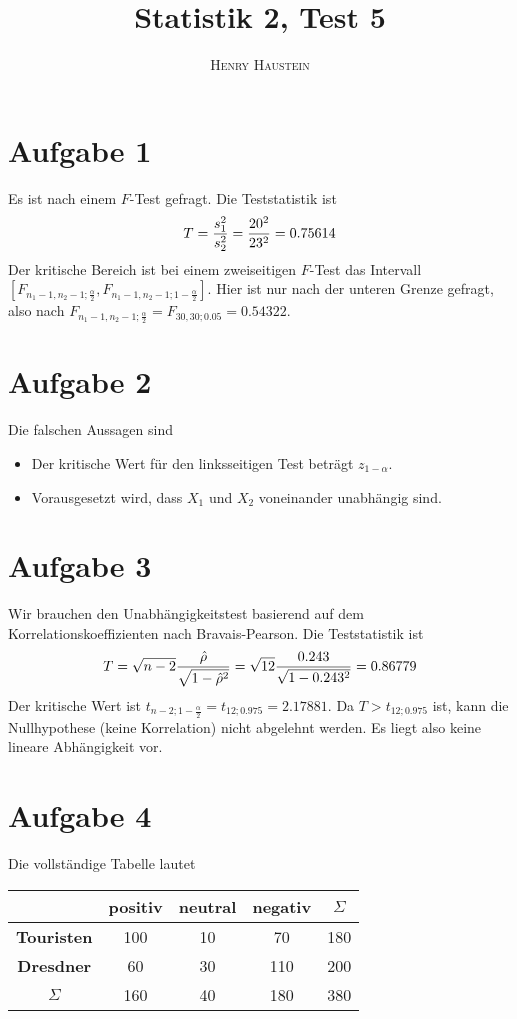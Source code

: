 \documentclass{article}
\title{\textbf{Statistik 2, Test 5}}
\author{\textsc{Henry Haustein}}
\date{}
\begin{document}
	\maketitle
	
	\section*{Aufgabe 1}
	Es ist nach einem $F$-Test gefragt. Die Teststatistik ist
	\begin{align}
		T = \frac{s_1^2}{s_2^2} = \frac{20^2}{23^2} = 0.75614 \notag
	\end{align}
	Der kritische Bereich ist bei einem zweiseitigen $F$-Test das Intervall $[F_{n_1-1,n_2-1;\frac{\alpha}{2}},F_{n_1-1,n_2-1;1-\frac{\alpha}{2}}]$. Hier ist nur nach der unteren Grenze gefragt, also nach $F_{n_1-1,n_2-1;\frac{\alpha}{2}}=F_{30,30;0.05}= 0.54322$.

	\section*{Aufgabe 2}
	Die falschen Aussagen sind
	\begin{itemize}
		\item Der kritische Wert für den linksseitigen Test beträgt $z_{1-\alpha}$.
		\item Vorausgesetzt wird, dass $X_1$ und $X_2$ voneinander unabhängig sind.
	\end{itemize}

	\section*{Aufgabe 3}
	Wir brauchen den Unabhängigkeitstest basierend auf dem Korrelationskoeffizienten nach Bravais-Pearson. Die Teststatistik ist
	\begin{align}
		T = \sqrt{n-2}\frac{\hat{\rho}}{\sqrt{1-\hat{\rho}^2}} = \sqrt{12}\frac{0.243}{\sqrt{1-0.243^2}} = 0.86779 \notag
	\end{align}
	Der kritische Wert ist $t_{n-2;1-\frac{\alpha}{2}} = t_{12;0.975} = 2.17881$. Da $T > t_{12;0.975}$ ist, kann die Nullhypothese (keine Korrelation) nicht abgelehnt werden. Es liegt also keine lineare Abhängigkeit vor.

	\section*{Aufgabe 4}
	Die vollständige Tabelle lautet
	\begin{center}
		\begin{tabular}{c|ccc|c}
			& \textbf{positiv} & \textbf{neutral} & \textbf{negativ} & $\Sigma$ \\
			\hline
			\textbf{Touristen} & 100 & 10 & 70 & 180 \\
			\textbf{Dresdner} & 60 & 30 & 110 & 200 \\
			\hline
			$\Sigma$ & 160 & 40 & 180 & 380
		\end{tabular}
	\end{center}
\end{document}
